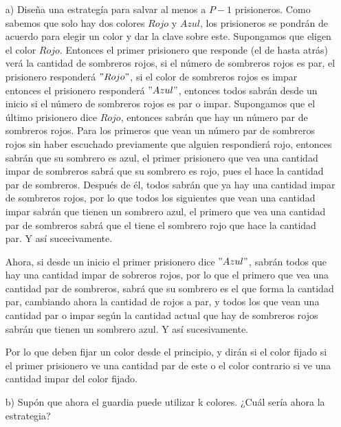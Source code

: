 \documentclass[12pt, letterpaper]{article}
\begin{document}
\begin{itemize}
\begin{itemize}
\item[a) ] Diseña una estrategía para salvar al menos a $P-1$ prisioneros.
Como sabemos que solo hay dos colores $Rojo$ y $Azul$, los prisioneros se pondrán de acuerdo para elegir un color y dar la clave sobre este. Supongamos que eligen el color $Rojo$. Entonces el primer prisionero que responde (el de hasta atrás) verá la cantidad de sombreros rojos, si el número de sombreros rojos es par, el prisionero responderá $"Rojo"$, si el color de sombreros rojos es impar entonces el prisionero responderá $"Azul"$, entonces todos sabrán desde un inicio si el número de sombreros rojos es par o impar. Supongamos que el último prisionero dice $Rojo$, entonces sabrán que hay un número par de sombreros rojos. Para los primeros que vean un número par de sombreros rojos sin haber escuchado previamente que alguien respondierá rojo, entonces sabrán que su sombrero es azul, el primer prisionero que vea una cantidad impar de sombreros sabrá que su sombrero es rojo, pues el hace la cantidad par de sombreros. Después de él, todos sabrán que ya hay una cantidad impar de sombreros rojos, por lo que todos los siguientes que vean una cantidad impar sabrán que tienen un sombrero azul, el primero que vea una cantidad par de sombreros sabrá que el tiene el sombrero rojo que hace la cantidad par. Y así sucecivamente.

Ahora, si desde un inicio el primer prisionero dice $"Azul"$, sabrán todos que hay una cantidad impar de sobreros rojos, por lo que el primero que vea una cantidad par de sombreros, sabrá que su sombrero es el que forma la cantidad par, cambiando ahora la cantidad de rojos a par, y todos los que vean una cantidad par o impar según la cantidad actual que hay de sombreros rojos sabrán que tienen un sombrero azul. Y así sucesivamente.

Por lo que deben fijar un color desde el principio, y dirán si el color fijado si el primer prisionero ve una cantidad par de este o el color contrario si ve una cantidad impar del color fijado.
\item[b) ] Supón que ahora el guardia puede utilizar k colores. ¿Cuál sería ahora la estrategia?
\end{itemize}


\end{itemize}
\end{document}
